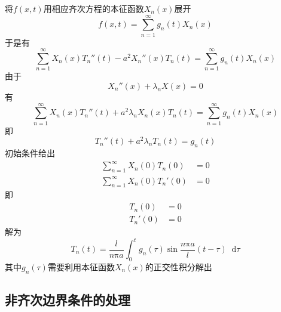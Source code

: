 \documentclass{article}
\newcommand*{\md}{\mathop{}\!\mathrm{d}}
\begin{document}
将$f(x,t)$用相应齐次方程的本征函数$X_{n}(x)$展开
\begin{equation*}
  f(x,t) = \sum\limits_{n=1}^{\infty} g_{n}(t) X_{n}(x)
\end{equation*}
于是有
\begin{equation*}
  \sum\limits_{n=1}^{\infty} X_{n}(x)T_{n}''(t) - a^{2} X_{n}''(x)T_{n}(t) = \sum\limits_{n=1}^{\infty} g_{n}(t) X_{n}(x)
\end{equation*}
由于
\begin{equation*}
  X_{n}''(x) + \lambda_{n} X(x) = 0
\end{equation*}
有
\begin{equation*}
  \sum\limits_{n=1}^{\infty} X_{n}(x)T_{n}''(t) + a^{2} \lambda_{n} X_{n}(x)T_{n}(t) = \sum\limits_{n=1}^{\infty} g_{n}(t) X_{n}(x)
\end{equation*}
即
\begin{equation*}
  T_{n}''(t) + a^{2} \lambda_{n}T_{n}(t) = g_{n}(t)
\end{equation*}
初始条件给出
\begin{equation*}
  \begin{aligned}
    \sum\limits_{n=1}^{\infty} X_{n}(0)T_{n}(0) &= 0\\
    \sum\limits_{n=1}^{\infty} X_{n}(0)T_{n}'(0) &= 0
  \end{aligned}
\end{equation*}
即
\begin{equation*}
  \begin{aligned}
    T_{n}(0) &= 0\\
    T_{n}'(0) &= 0
  \end{aligned}
\end{equation*}
解为
\begin{equation*}
  T_{n}(t) = \dfrac{l}{n \mathrm{\pi} a} \int_{0}^{t} g_{n} (\tau) \sin \dfrac{n \mathrm{\pi} a}{l} (t - \tau ) \md \tau 
\end{equation*}
其中$g_{n}(\tau)$需要利用本征函数$X_{n}(x)$的正交性积分解出

\subsection{非齐次边界条件的处理}
\end{document}
